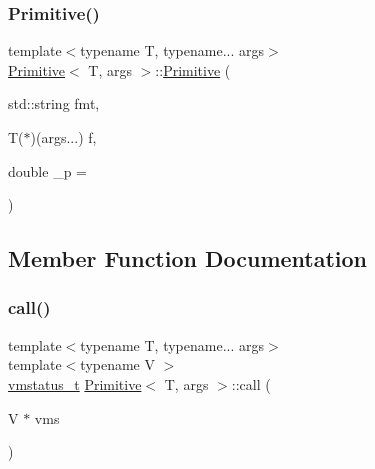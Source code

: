 \mbox{\label{struct_primitive_a4303c3567a7bb2921d298f48b07b0add}} 
\subsubsection{\texorpdfstring{Primitive()}{Primitive()}\hspace{0.1cm}{\footnotesize\ttfamily [2/2]}}
{\footnotesize\ttfamily template$<$typename T, typename... args$>$ \\
\hyperlink{struct_primitive}{Primitive}$<$ T, args $>$\+::\hyperlink{struct_primitive}{Primitive} (\begin{DoxyParamCaption}\item[{std\+::string}]{fmt,  }\item[{T($\ast$)(args...)}]{f,  }\item[{double}]{\+\_\+p = {} }\end{DoxyParamCaption})\hspace{0.3cm}{\ttfamily [inline]}}



\subsection{Member Function Documentation}
\mbox{\label{struct_primitive_aa776657a1c5101422799c33a8d2cfaef}} 
\subsubsection{\texorpdfstring{call()}{call()}}
{\footnotesize\ttfamily template$<$typename T, typename... args$>$ \\
template$<$typename V $>$ \\
\hyperlink{_instruction_8h_a6202215407ab29590bb936ca2996cf64}{vmstatus\+\_\+t} \hyperlink{struct_primitive}{Primitive}$<$ T, args $>$\+::call (\begin{DoxyParamCaption}\item[{V $\ast$}]{vms }\end{DoxyParamCaption})\hspace{0.3cm}{\ttfamily [inline]}}

\mbox{\label{struct_primitive_a10cedec90ed4a3ff01be2bd3b9c36528}} 
